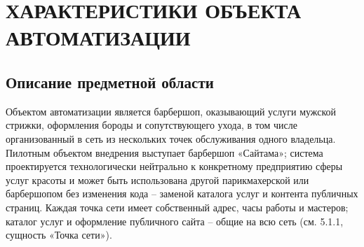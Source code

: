 \section{ХАРАКТЕРИСТИКИ ОБЪЕКТА АВТОМАТИЗАЦИИ}

\subsection{Описание предметной области}

Объектом автоматизации является барбершоп, оказывающий услуги мужской стрижки, оформления бороды и сопутствующего ухода, в том числе организованный в сеть из нескольких точек обслуживания одного владельца. Пилотным объектом внедрения выступает барбершоп «Сайтама»; система проектируется технологически нейтрально к конкретному предприятию сферы услуг красоты и может быть использована другой парикмахерской или барбершопом без изменения кода -- заменой каталога услуг и контента публичных страниц. Каждая точка сети имеет собственный адрес, часы работы и мастеров; каталог услуг и оформление публичного сайта -- общие на всю сеть (см. 5.1.1, сущность «Точка сети»).

